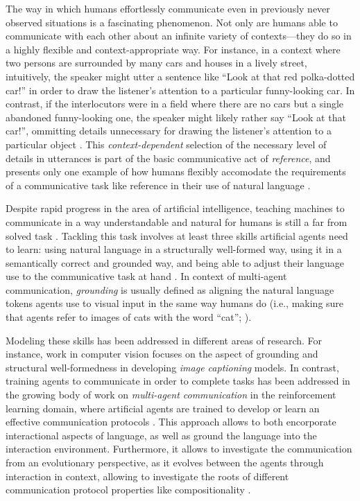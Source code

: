 The way in which humans effortlessly communicate even in previously never observed situations is a fascinating phenomenon. Not only are humans able to communicate with each other about an infinite variety of contexts---they do so in a highly flexible and context-appropriate way. For instance, in a context where two persons are surrounded by many cars and houses in a lively street, intuitively, the speaker might utter a sentence like ``Look at that red polka-dotted car!'' in order to draw the listener's attention to a particular funny-looking car. In contrast, if the interlocutors were in a field where there are no cars but a single abandoned funny-looking one, the speaker might likely rather say ``Look at that car!'', ommitting details unnecessary for drawing the listener's attention to a particular object \parencite[cf.][]{graf2016animal, degen2020redundancy}. This \textit{context-dependent} selection of the necessary level of details in utterances is part of the basic communicative act of \textit{reference}, and presents only one example of how humans flexibly accomodate the requirements of a communicative task like reference in their use of natural language \parencite{searle1969speech, grice1975logic}.

Despite rapid progress in the area of artificial intelligence, teaching machines to communicate in a way understandable and natural for humans is still a far from solved task \parencite{lazaridou2020emergent, lake2017building, lecun2015deep}. Tackling this task involves at least three skills artificial agents need to learn: using natural language in a structurally well-formed way, using it in a semantically correct and grounded way, and being able to adjust their language use to the communicative task at hand \parencite{lazaridou2020emergent}. In context of multi-agent communication, \textit{grounding} is usually defined as aligning the natural language tokens agents use to visual input in the same way humans do (i.e., making sure that agents refer to images of cats with the word ``cat''; \cite{jurafsky2000speech}).

Modeling these skills has been addressed in different areas of research. For instance, work in computer vision focuses on the aspect of grounding and structural well-formedness in developing \textit{image captioning} models.
In contrast, training agents to communicate in order to complete tasks has been addressed in the growing body of work on \textit{multi-agent communication} in the reinforcement learning domain, where artificial agents are trained to develop or learn an effective communication protocols \parencite[e.g.,][]{foerster2016learning, lazaridou2020emergent}.
This approach allows to both encorporate interactional aspects of language, as well as ground the language into the interaction environment. Furthermore, it allows to investigate the communication from an evolutionary perspective, as it evolves between the agents through interaction in context, allowing to investigate the roots of different communication protocol properties like compositionality \parencite{lazaridou2020emergent}. 

